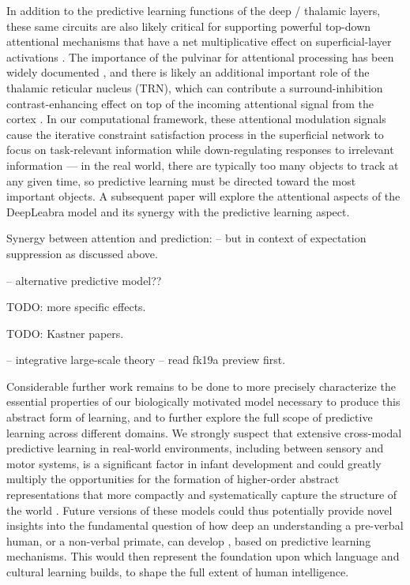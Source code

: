 \documentclass[11pt,twoside]{article}
\newif\myifpdf
\begin{document}
In addition to the predictive learning functions of the deep / thalamic layers, these same circuits are also likely critical for supporting powerful top-down attentional mechanisms that have a net multiplicative effect on superficial-layer activations \cite{BortoneOlsenScanziani14,OlsenBortoneAdesnikEtAl12,BortoneOlsenScanziani14,OlsenBortoneAdesnikEtAl12}. The importance of the pulvinar for attentional processing has been widely documented \cite[e.g.,]{LaBergeBuchsbaum90,BenderYouakim01,SaalmannPinskWangEtAl12}, and there is likely an additional important role of the thalamic reticular nucleus (TRN), which can contribute a surround-inhibition contrast-enhancing effect on top of the incoming attentional signal from the cortex \cite{Crick84,Pinault04,WimmerSchmittDavidsonEtAl15}.  In our computational framework, these attentional modulation signals cause the iterative constraint satisfaction process in the superficial network to focus on task-relevant information while down-regulating responses to irrelevant information --- in the real world, there are typically too many objects to track at any given time, so predictive learning must be directed toward the most important objects. A subsequent paper will explore the attentional aspects of the DeepLeabra model and its synergy with the predictive learning aspect.

Synergy between attention and prediction: \cite{RichterdeLange19} -- but in context of expectation suppression as discussed above.

\cite{KellerMrsic-Flogel18} -- alternative predictive model??

TODO: more specific effects.

TODO: Kastner papers.  \cite{HalassaKastner17}   \cite{FiebelkornPinskKastner18}  \cite{FiebelkornKastner19}

\cite{JaramilloMejiasWang19} -- integrative large-scale theory -- read fk19a preview first.

Considerable further work remains to be done to more precisely characterize the essential properties of our biologically motivated model necessary to produce this abstract form of learning, and to further explore the full scope of predictive learning across different domains.  We strongly suspect that extensive cross-modal predictive learning in real-world environments, including between sensory and motor systems, is a significant factor in infant development and could greatly multiply the opportunities for the formation of higher-order abstract representations that more compactly and systematically capture the structure of the world \cite{YuSmith12}.  Future versions of these models could thus potentially provide novel insights into the fundamental question of how deep an understanding a pre-verbal human, or a non-verbal primate, can develop \cite{SpelkeBreinlingerMacomberEtAl92,ElmanBatesKarmiloff-SmithEtAl96}, based on predictive learning mechanisms.  This would then represent the foundation upon which language and cultural learning builds, to shape the full extent of human intelligence.

\clearpage



\clearpage


\end{document}
